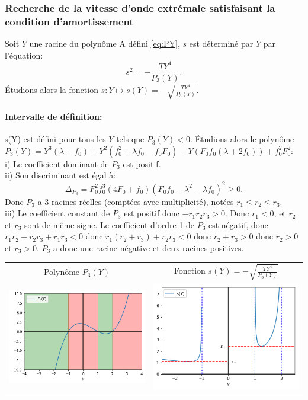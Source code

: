 \documentclass[11pt]{article}
\begin{document}
\subsubsection{Recherche de la vitesse d'onde extrémale satisfaisant la condition d'amortissement}
Soit $Y$ une racine du polynôme A défini \ref{eq:PY}, $s$ est déterminé par $Y$ par l'équation: \begin{equation}
	s^2 = -\frac{TY^4}{P_3(Y)}. \label{eq:sfromY}
\end{equation} 
Étudions alors la fonction $ s: Y \mapsto s(Y) = -\sqrt{\frac{TY^4}{P_3(Y)}} $.

\paragraph{Intervalle de définition:}
s(Y) est défini pour tous les $Y$ tels que $P_3(Y)<0$. Étudions alors le polynôme $P_3(Y)=Y^3(\lambda + f_0)+ Y^2(f_0^2+ \lambda f_0 - f_0F_0)- Y(F_0f_0(\lambda+2f_0)) + f_0^2F_0^2$:\\
i) Le coefficient dominant de $P_3$ est positif.\\
ii) Son discriminant est égal à: \begin{equation}
	\Delta_{P_3}= F_{0}^{2} f_{0}^{3} (4 F_{0} + f_{0}) (F_{0} f_{0} -\lambda ^{2} - \lambda  f_{0})^{2} \geq 0.
\end{equation}
Donc $P_3$ a 3 racines réelles (comptées avec multiplicité), notées $r_1\leq r_2 \leq r_3$.\\
iii) Le coefficient constant de $P_3$ est positif donc $-r_1r_2r_3>0$. Donc $r_1<0$, et $r_2$ et $r_3$ sont de même signe. Le coefficient d'ordre 1 de $P_3$ est négatif, donc $r_1r_2 + r_2r_3 + r_1r_3<0$ donc $r_1(r_2+r_3)+r_2r_3<0$ donc $r_2+r_3>0$ donc $r_2>0$ et $r_3>0$. $P_3$ a donc une racine négative et deux racines positives.

\begin{tabular}{cc}
 Polynôme $P_3(Y)$ & Fonction $s(Y) = -\sqrt{\frac{TY^4}{P_3(Y)}}$ \\
\includegraphics[width=.47\textwidth]{Images/P3.png} & \includegraphics[width=.47\textwidth]{Images/s+s-.png} \\
\end{tabular}
\end{document}

